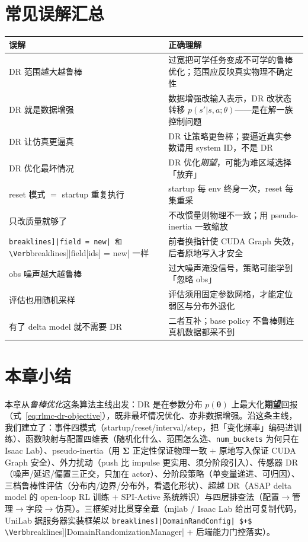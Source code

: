 \section*{常见误解汇总}
\label{sec:rlmc-dr-myths}

\begin{center}
\small
\begin{tabular}{@{}p{5.4cm}p{7.0cm}@{}}
\toprule
误解 & 正确理解 \\
\midrule
DR 范围越大越鲁棒 & 过宽把可学任务变成不可学的鲁棒优化；范围应反映真实物理不确定性 \\
DR 就是数据增强 & 数据增强改输入表示，DR 改状态转移 $p(s'|s,a;\theta)$——是在解一族控制问题 \\
DR 让仿真更逼真 & DR 让策略更鲁棒；要逼近真实参数请用 system ID，不是 DR \\
DR 优化最坏情况 & DR 优化\emph{期望}，可能为难区域选择「放弃」 \\
reset 模式 $=$ startup 重复执行 & startup 每 env 终身一次，reset 每集重采 \\
只改质量就够了 & 不改惯量则物理不一致；用 pseudo-inertia 一致缩放 \\
\Verb[breaklines]|field = new| 和 \Verb[breaklines]|field[ids] = new| 一样 & 前者换指针使 CUDA Graph 失效，后者原地写入才安全 \\
obs 噪声越大越鲁棒 & 过大噪声淹没信号，策略可能学到「忽略 obs」 \\
评估也用随机采样 & 评估须用固定参数网格，才能定位弱区与分布外退化 \\
有了 delta model 就不需要 DR & 二者互补；base policy 不鲁棒则连真机数据都采不到 \\
\bottomrule
\end{tabular}
\end{center}

\section*{本章小结}
\label{sec:rlmc-dr-summary}

本章从\emph{鲁棒优化}这条算法主线出发：DR 是在参数分布 $p(\boldsymbol\theta)$ 上最大化\textbf{期望}回报（式~\eqref{eq:rlmc-dr-objective}），既非最坏情况优化、亦非数据增强。沿这条主线，我们建立了：事件四模式（startup/reset/interval/step，把「变化频率」编码进训练）、函数映射与配置四维表（随机化什么、范围怎么选、\verb|num_buckets| 为何只在 Isaac Lab）、pseudo-inertia（用 $\boldsymbol\Sigma$ 正定性保证物理一致 $+$ 原地写入保证 CUDA Graph 安全）、外力扰动（push 比 impulse 更实用、须分阶段引入）、传感器 DR（噪声/延迟/偏置三正交，只加在 actor）、分阶段策略（单变量递进、可归因）、三档鲁棒性评估（分布内/边界/分布外，看退化形状）、超越 DR（ASAP delta model 的 open-loop RL 训练 $+$ SPI-Active 系统辨识）与四层排查法（配置$\to$管理$\to$字段$\to$仿真）。三框架对比贯穿全章（mjlab / Isaac Lab 给出可复制代码，UniLab 据服务器实装框架以 \Verb[breaklines]|DomainRandConfig| $+$ \Verb[breaklines]|DomainRandomizationManager| $+$ 后端能力门控落实）。

